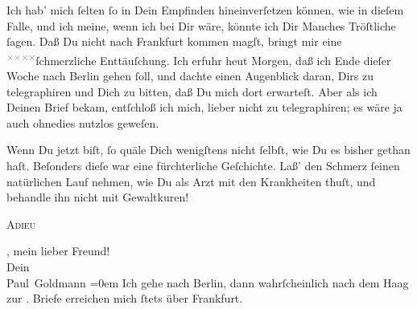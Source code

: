 \pstart
           Ich hab’ mich ſelten ſo in Dein \strikeout{\textcolor{gray}{×}}{ }{\pb}Empfinden hineinverſetzen können, wie \strikeout{\textcolor{gray}{gege}} in dieſem Falle, und ich meine, wenn ich bei Dir wäre, könnte ich Dir \strikeout{\textcolor{gray}{m}} Manches Tröſtliche ſagen. Daß Du nicht nach Frankfurt kommen magſt, bringt mir eine \substVorne{}\textsuperscript{\textcolor{gray}{×}\-\textcolor{gray}{×}\-\textcolor{gray}{×}\-\textcolor{gray}{×}}\substDazwischen{}ſchmerzliche\substHinten{} Enttäuſchung. Ich erfuhr heut{ }Morgen, daß ich Ende dieſer Woche nach Berlin gehen ſoll, und dachte einen Augenblick daran, Dirs zu telegraphiren
               und \introOben{}Dich\introOben{} zu bitten,  daß
               Du mich dort erwarteſt. Aber  als ich Deinen Brief bekam, entſchloß ich mich, lieber nicht zu telegraphiren;
               es wäre ja auch ohnedies nutzlos geweſen.\pend
           
\pstart
           Wenn Du jetzt \label{K_L02874-3v}\label{K_L02874-3}{ } biſt, ſo quäle Dich
               wenigſtens nicht ſelbſt, wie Du es bisher gethan haſt. Beſonders {\pb}dieſe \label{K_L02874-4v}\label{K_L02874-4} war eine fürchterliche Geſchichte. Laß’ den Schmerz ſeinen natürlichen Lauf
               nehmen, wie Du als Arzt mit den Krankheiten thuſt, und behandle ihn nicht mit
               Gewaltkuren!\pend
           
\pstart
           \begin{otherlanguage}{french}\textsc{Adieu}\end{otherlanguage}, mein lieber Freund! {\\[\baselineskip]}Dein {\\[\baselineskip]}\spacefill\mbox{Paul Goldmann}\pend
           \leftskip=0em{}
\pstart
           \noindent{}Ich gehe nach Berlin, dann wahrſcheinlich nach
                  dem Haag zur \label{K_L02874-5v}\label{K_L02874-5}.  Briefe erreichen mich ſtets über Frankfurt.\pend
           \endnumbering{}  
      